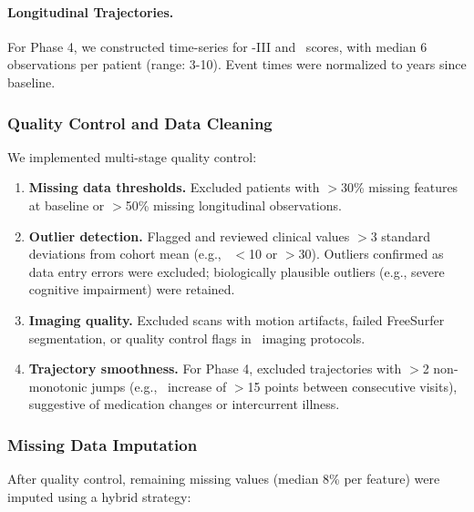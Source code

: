 \paragraph{Longitudinal Trajectories.}
For Phase 4, we constructed time-series for \updrs-III and \moca\ scores, with median 6 observations per patient (range: 3-10). Event times were normalized to years since baseline.

\subsubsection{Quality Control and Data Cleaning}

We implemented multi-stage quality control:

\begin{enumerate}
    \item \textbf{Missing data thresholds.} Excluded patients with $>$30\% missing features at baseline or $>$50\% missing longitudinal observations.
    
    \item \textbf{Outlier detection.} Flagged and reviewed clinical values $>$3 standard deviations from cohort mean (e.g., \moca\ $<$10 or $>$30). Outliers confirmed as data entry errors were excluded; biologically plausible outliers (e.g., severe cognitive impairment) were retained.
    
    \item \textbf{Imaging quality.} Excluded scans with motion artifacts, failed FreeSurfer segmentation, or quality control flags in \ppmi\ imaging protocols.
    
    \item \textbf{Trajectory smoothness.} For Phase 4, excluded trajectories with $>$2 non-monotonic jumps (e.g., \updrs\ increase of $>$15 points between consecutive visits), suggestive of medication changes or intercurrent illness.
\end{enumerate}

\subsubsection{Missing Data Imputation}

After quality control, remaining missing values (median 8\% per feature) were imputed using a hybrid strategy:

